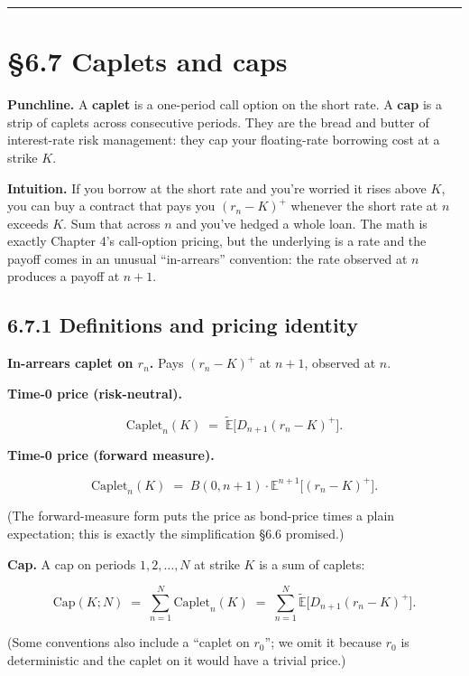 \documentclass[
  10pt,
  twoside]{book}
\begin{document}
\begin{center}\rule{0.5\linewidth}{0.5pt}\end{center}

\section{§6.7 Caplets and caps}\label{caplets-and-caps}

\textbf{Punchline.} A \textbf{caplet} is a one-period call option on the
short rate. A \textbf{cap} is a strip of caplets across consecutive
periods. They are the bread and butter of interest-rate risk management:
they cap your floating-rate borrowing cost at a strike \(K\).

\textbf{Intuition.} If you borrow at the short rate and you're worried
it rises above \(K\), you can buy a contract that pays you
\((r_n - K)^+\) whenever the short rate at \(n\) exceeds \(K\). Sum that
across \(n\) and you've hedged a whole loan. The math is exactly Chapter
4's call-option pricing, but the underlying is a rate and the payoff
comes in an unusual ``in-arrears'' convention: the rate observed at
\(n\) produces a payoff at \(n+1\).

\subsection{6.7.1 Definitions and pricing
identity}\label{definitions-and-pricing-identity}

\textbf{In-arrears caplet on \(r_n\).} Pays \((r_n - K)^+\) at \(n+1\),
observed at \(n\).

\textbf{Time-0 price (risk-neutral).}

\[\text{Caplet}_n(K) \;=\; \tilde{\mathbb E}\bigl[D_{n+1} (r_n - K)^+\bigr].\]

\textbf{Time-0 price (forward measure).}

\[\text{Caplet}_n(K) \;=\; B(0, n+1) \cdot \mathbb E^{n+1}\bigl[(r_n - K)^+\bigr].\]

(The forward-measure form puts the price as bond-price times a plain
expectation; this is exactly the simplification §6.6 promised.)

\textbf{Cap.} A cap on periods \(1, 2, \ldots, N\) at strike \(K\) is a
sum of caplets:

\[\text{Cap}(K; N) \;=\; \sum_{n=1}^{N} \text{Caplet}_n(K) \;=\; \sum_{n=1}^{N} \tilde{\mathbb E}\bigl[D_{n+1} (r_n - K)^+\bigr].\]

(Some conventions also include a ``caplet on \(r_0\)''; we omit it
because \(r_0\) is deterministic and the caplet on it would have a
trivial price.)
\end{document}

